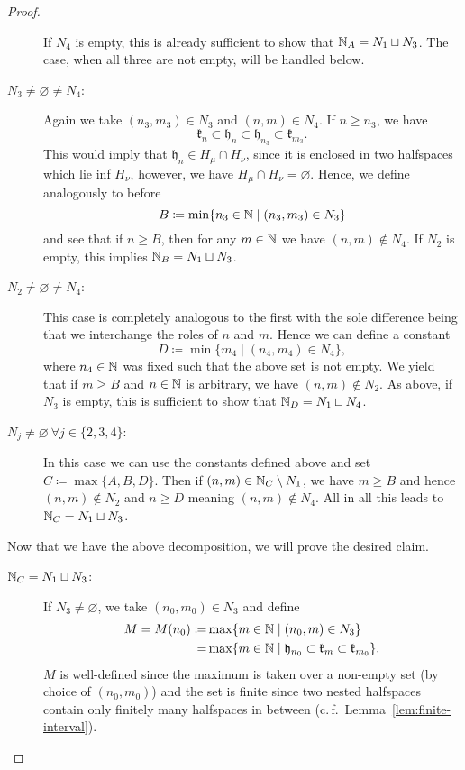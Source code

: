 \begin{proof}
\begin{description}
\[    \]
    If \(N_4\) is empty, this is already sufficient to show that \(\mathbb{N}_A = N_1 \sqcup N_3\). The case, when all three are not empty, will be handled below.
  \item[\(N_3 \neq \varnothing \neq N_4\):] Again we take \((n_3, m_3) \in N_3\) and \((n,m) \in N_4\). If \(n \geq n_3\), we have
    \[
      \mathfrak{k}_n \subset \mathfrak{h}_n \subset \mathfrak{h}_{n_3} \subset \mathfrak{k}_{m_3}.
    \]
    This would imply that \(\mathfrak{h}_n \in H_\mu \cap H_\nu\), since it is enclosed in two halfspaces which lie inf \(H_\nu\), however, we have \(H_\mu \cap H_\nu = \varnothing\). Hence, we define analogously to before
    \[
      B \coloneqq \min \{n_3 \in \mathbb{N} \mid (n_3, m_3) \in N_3\}
    \]
    and see that if \(n \geq B\), then for any \(m \in \mathbb{N}\) we have \((n,m) \notin N_4\). If \(N_2\) is empty, this implies \(\mathbb{N}_B = N_1 \sqcup N_3\).
  \item[\(N_2 \neq \varnothing \neq N_4\):] This case is completely analogous to the first with the sole difference being that we interchange the roles of \(n\) and \(m\). Hence we can define a constant
    \[
      D \coloneqq \min \{m_4 \mid (n_4, m_4) \in N_4\},
    \]
    where \(n_4 \in \mathbb{N}\) was fixed such that the above set is not empty. We yield that if \(m \geq B\) and \(n \in \mathbb{N}\) is arbitrary, we have \((n, m) \notin N_2\). As above, if \(N_3 \) is empty, this is sufficient to show that \(\mathbb{N}_D = N_1 \sqcup N_4\).
  \item[\(N_j \neq \varnothing\ \forall j \in\{2,3,4\}\):] In this case we can use the constants defined above and set \(C \coloneqq \max \{A,B,D\}\). Then if \((n,m) \in \mathbb{N}_C \setminus N_1\), we have \(m \geq B\) and hence \((n,m) \notin N_2\) and \(n \geq D\) meaning \((n,m) \notin N_4\). All in all this leads to \(\mathbb{N}_C = N_1 \sqcup N_3\).
  \end{description}
  Now that we have the above decomposition, we will prove the desired claim.
  \begin{description}
  \item[\(\mathbb{N}_C = N_1 \sqcup N_3\):] If \(N_3 \neq \varnothing\), we take \((n_0, m_0) \in N_3\) and define
    \begin{align*}
      M = M(n_0)  \coloneqq & \max \{m \in \mathbb{N} \mid (n_0, m) \in N_3\}\\
                      = & \max \{m \in \mathbb{N} \mid \mathfrak{h}_{n_0} \subset \mathfrak{k}_m \subset \mathfrak{k}_{m_0}\}.
    \end{align*}
    \(M\) is well-defined since the maximum is taken over a non-empty set (by choice of \((n_0, m_0)\)) and the set is finite since two nested halfspaces contain only finitely many halfspaces in between (c.\,f.\ Lemma~\ref{lem:finite-interval}).


\end{description}
\end{proof}
